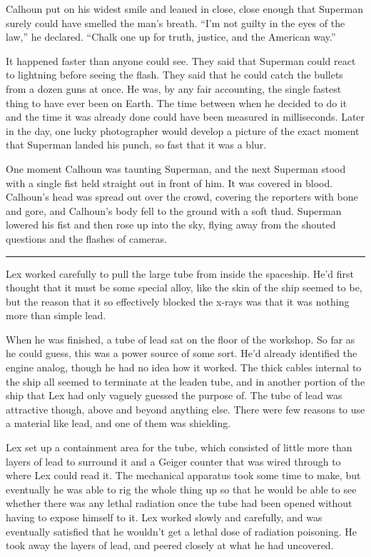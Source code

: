 Calhoun put on his widest smile and leaned in close, close enough that
Superman surely could have smelled the man's breath. ``I'm not guilty in
the eyes of the law,'' he declared. ``Chalk one up for truth, justice,
and the American way.''

It happened faster than anyone could see. They said that Superman could
react to lightning before seeing the flash. They said that he could
catch the bullets from a dozen guns at once. He was, by any fair
accounting, the single fastest thing to have ever been on Earth. The
time between when he decided to do it and the time it was already done
could have been measured in milliseconds. Later in the day, one lucky
photographer would develop a picture of the exact moment that Superman
landed his punch, so fast that it was a blur.

One moment Calhoun was taunting Superman, and the next Superman stood
with a single fist held straight out in front of him. It was covered in
blood. Calhoun's head was spread out over the crowd, covering the
reporters with bone and gore, and Calhoun's body fell to the ground with
a soft thud. Superman lowered his fist and then rose up into the sky,
flying away from the shouted questions and the flashes of cameras.

\begin{center}\rule{0.5\linewidth}{\linethickness}\end{center}

Lex worked carefully to pull the large tube from inside the spaceship.
He'd first thought that it must be some special alloy, like the skin of
the ship seemed to be, but the reason that it so effectively blocked the
x‐rays was that it was nothing more than simple lead.

When he was finished, a tube of lead sat on the floor of the workshop.
So far as he could guess, this was a power source of some sort. He'd
already identified the engine analog, though he had no idea how it
worked. The thick cables internal to the ship all seemed to terminate at
the leaden tube, and in another portion of the ship that Lex had only
vaguely guessed the purpose of. The tube of lead was attractive though,
above and beyond anything else. There were few reasons to use a material
like lead, and one of them was shielding.

Lex set up a containment area for the tube, which consisted of little
more than layers of lead to surround it and a Geiger counter that was
wired through to where Lex could read it. The mechanical apparatus took
some time to make, but eventually he was able to rig the whole thing up
so that he would be able to see whether there was any lethal radiation
once the tube had been opened without having to expose himself to it.
Lex worked slowly and carefully, and was eventually satisfied that he
wouldn't get a lethal dose of radiation poisoning. He took away the
layers of lead, and peered closely at what he had uncovered.

